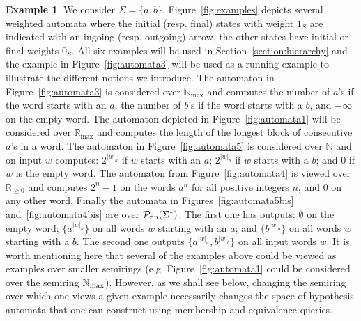 \documentclass[10pt,a4paper]{amsart}
\theoremstyle{definition}
\newtheorem{exa}[thm]{Example}
\numberwithin{equation}{section}
\numberwithin{theorem}{section}
\begin{document}
\begin{exa}
We consider $\Sigma=\{a,b\}$. Figure~\ref{fig:examples} depicts several weighted automata where the initial (resp. final) states with weight $1_S$ are indicated with an ingoing (resp. outgoing) arrow, the other states have initial or final weights $0_S$. 
All six examples will be used in Section~\ref{section:hierarchy} and the example in Figure~\ref{fig:automata3} will be used as a running example to illustrate the different notions we introduce.
The automaton in Figure~\ref{fig:automata3} is considered over $\mathbb{N}_{\max}$ and computes the number of $a$'s if the word starts with an $a$, the number of $b$'s if the word starts with a $b$, and $-\infty$ on the empty word. The automaton depicted in Figure~\ref{fig:automata1} will be considered over $\mathbb{R}_{\max}$ and computes the length of the longest block of consecutive $a$'s in a word. The automaton in Figure~\ref{fig:automata5} is considered over $\mathbb{N}$ and on input $w$ computes: $2^{|w|_a}$  if $w$ starts with an $a$; $2^{|w|_b}$ if $w$ starts with a $b$; and $0$ if $w$ is the empty word. The automaton from Figure~\ref{fig:automata4} is viewed over $\mathbb{R}_{\geq 0}$ and computes $2^n - 1$ on the words $a^n$ for all positive integers $n$, and $0$ on any other word. Finally the automata in Figures~\ref{fig:automata5bis} and~\ref{fig:automata4bis} are over $\mathcal{P}_{\rm fin}(\Sigma^*)$. The first one has outputs: $\emptyset$ on the empty word; $\{a^{|w|_a}\}$ on all words $w$ starting with an $a$; and $\{b^{|w|_b}\}$ on all words $w$ starting with a $b$. The second one outputs $\{a^{|w|_a},b^{|w|_b}\}$ on all input words $w$. It is worth mentioning here that several of the examples above could be viewed as examples over smaller semirings (e.g. Figure~\ref{fig:automata1} could be considered over the semiring $\mathbb{N}_{\rm max}$). However, as we shall see below, changing the semiring over which one views a given example necessarily changes the space of hypothesis automata that one can construct using membership and equivalence queries. 
\end{exa}
\end{document}
